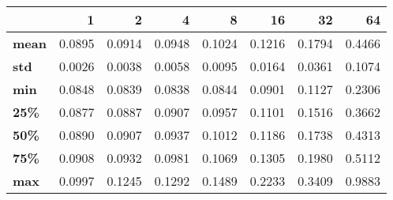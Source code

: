 \begin{tabular}{lrrrrrrr}
\toprule
{} &      1  &      2  &      4  &      8  &      16 &      32 &      64 \\
\midrule
\textbf{mean} &  0.0895 &  0.0914 &  0.0948 &  0.1024 &  0.1216 &  0.1794 &  0.4466 \\
\textbf{std } &  0.0026 &  0.0038 &  0.0058 &  0.0095 &  0.0164 &  0.0361 &  0.1074 \\
\textbf{min } &  0.0848 &  0.0839 &  0.0838 &  0.0844 &  0.0901 &  0.1127 &  0.2306 \\
\textbf{25\% } &  0.0877 &  0.0887 &  0.0907 &  0.0957 &  0.1101 &  0.1516 &  0.3662 \\
\textbf{50\% } &  0.0890 &  0.0907 &  0.0937 &  0.1012 &  0.1186 &  0.1738 &  0.4313 \\
\textbf{75\% } &  0.0908 &  0.0932 &  0.0981 &  0.1069 &  0.1305 &  0.1980 &  0.5112 \\
\textbf{max } &  0.0997 &  0.1245 &  0.1292 &  0.1489 &  0.2233 &  0.3409 &  0.9883 \\
\bottomrule
\end{tabular}
